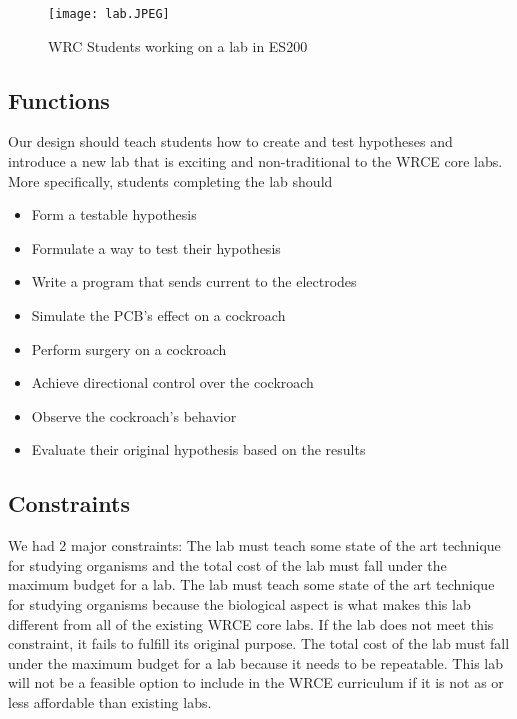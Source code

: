 \documentclass{article}
\begin{document}
\begin{figure}[ht!]
\centering
\texttt{[image: lab.JPEG]}
\caption{WRC Students working on a lab in ES200}
\label{fig:hollywood}
\end{figure}

\subsection{Functions}
\par Our design should teach students how to create and test hypotheses and introduce a new lab that is exciting and non-traditional to the WRCE core labs. More specifically, students completing the lab should

\begin{itemize}
  \item Form a testable hypothesis
  \item Formulate a way to test their hypothesis
  \item Write a program that sends current to the electrodes
  \item Simulate the PCB's effect on a cockroach
  \item Perform surgery on a cockroach
  \item Achieve directional control over the cockroach
  \item Observe the cockroach's behavior
  \item Evaluate their original hypothesis based on the results
\end{itemize}

\subsection{Constraints}
\par We had 2 major constraints: The lab must teach some state of the art technique for studying organisms and the total cost of the lab must fall under the maximum budget for a lab. The lab must teach some state of the art technique for studying organisms because the biological aspect is what makes this lab different from all of the existing WRCE core labs. If the lab does not meet this constraint, it fails to fulfill its original purpose. The total cost of the lab must fall under the maximum budget for a lab because it needs to be repeatable. This lab will not be a feasible option to include in the WRCE curriculum if it is not as or less affordable than existing labs.
\end{document}
